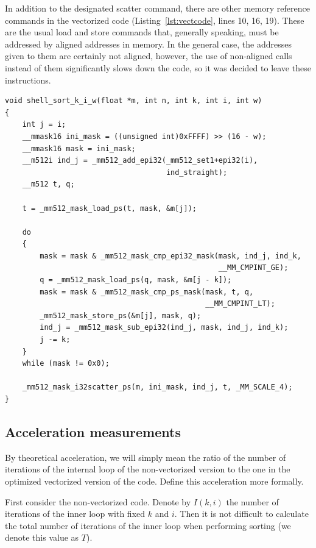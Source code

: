 \documentclass[
11pt,%
tightenlines,%
twoside,%
onecolumn,%
nofloats,%
nobibnotes,%
nofootinbib,%
superscriptaddress,%
noshowpacs,%
centertags]%
{revtex4}
\begin{document}
In addition to the designated scatter command, there are other memory reference commands in the vectorized code (Listing~\ref{lst:vectcode}, lines 10, 16, 19).
These are the usual load and store commands that, generally speaking, must be addressed by aligned addresses in memory.
In the general case, the addresses given to them are certainly not aligned, however, the use of non-aligned calls instead of them significantly slows down the code, so it was decided to leave these instructions.

\begin{lstlisting}[caption={Vectorized version of Shell sorting kernel},label={lst:vectcode}]
void shell_sort_k_i_w(float *m, int n, int k, int i, int w)
{
    int j = i;
    __mmask16 ini_mask = ((unsigned int)0xFFFF) >> (16 - w);
    __mmask16 mask = ini_mask;
    __m512i ind_j = _mm512_add_epi32(_mm512_set1+epi32(i),
                                     ind_straight);
    __m512 t, q;
    
    t = _mm512_mask_load_ps(t, mask, &m[j]);

    do
    {
        mask = mask & _mm512_mask_cmp_epi32_mask(mask, ind_j, ind_k,
                                                 __MM_CMPINT_GE);
        q = _mm512_mask_load_ps(q, mask, &m[j - k]);
        mask = mask & _mm512_mask_cmp_ps_mask(mask, t, q,
                                              __MM_CMPINT_LT);
        _mm512_mask_store_ps(&m[j], mask, q);
        ind_j = _mm512_mask_sub_epi32(ind_j, mask, ind_j, ind_k);
        j -= k;
    }
    while (mask != 0x0);
    
    _mm512_mask_i32scatter_ps(m, ini_mask, ind_j, t, _MM_SCALE_4);
}
\end{lstlisting}

\subsection{Acceleration measurements}

By theoretical acceleration, we will simply mean the ratio of the number of iterations of the internal loop of the non-vectorized version to the one in the optimized vectorized version of the code.
Define this acceleration more formally.

First consider the non-vectorized code.
Denote by $ I (k, i) $ the number of iterations of the inner loop with fixed $ k $ and $ i $.
Then it is not difficult to calculate the total number of iterations of the inner loop when performing sorting (we denote this value as $T$).
\end{document}
